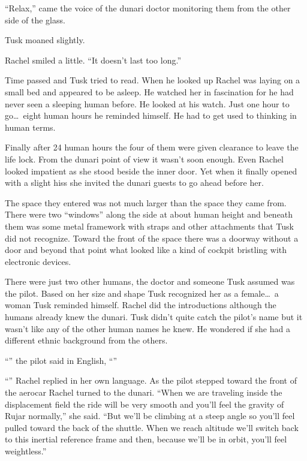 ``Relax,'' came the voice of the dunari doctor monitoring them from the other side of the glass.

Tusk moaned slightly.

Rachel smiled a little. ``It doesn't last too long.''

Time passed and Tusk tried to read. When he looked up Rachel was laying on a small bed and
appeared to be asleep. He watched her in fascination for he had never seen a sleeping human
before. He looked at his watch. Just one hour to go\ldots\ eight human hours he reminded
himself. He had to get used to thinking in human terms.

Finally after 24 human hours the four of them were given clearance to leave the life lock. From
the dunari point of view it wasn't soon enough. Even Rachel looked impatient as she stood beside
the inner door. Yet when it finally opened with a slight hiss she invited the dunari guests to
go ahead before her.

The space they entered was not much larger than the space they came from. There were two
``windows'' along the side at about human height and beneath them was some metal framework with
straps and other attachments that Tusk did not recognize. Toward the front of the space there
was a doorway without a door and beyond that point what looked like a kind of cockpit bristling
with electronic devices.


There were just two other humans, the doctor and someone Tusk assumed was the pilot. Based on
her size and shape Tusk recognized her as a female\ldots\ a woman Tusk reminded himself. Rachel
did the introductions although the humans already knew the dunari. Tusk didn't quite catch the
pilot's name but it wasn't like any of the other human names he knew. He wondered if she had a
different ethnic background from the others.

``'' the pilot said in English, ``''

``'' Rachel replied in her own language. As the pilot stepped toward the
front of the aerocar Rachel turned to the dunari. ``When we are traveling inside the
displacement field the ride will be very smooth and you'll feel the gravity of Rujar normally,''
she said. ``But we'll be climbing at a steep angle so you'll feel pulled toward the back of the
shuttle. When we reach altitude we'll switch back to this inertial reference frame and then,
because we'll be in orbit, you'll feel weightless.''

